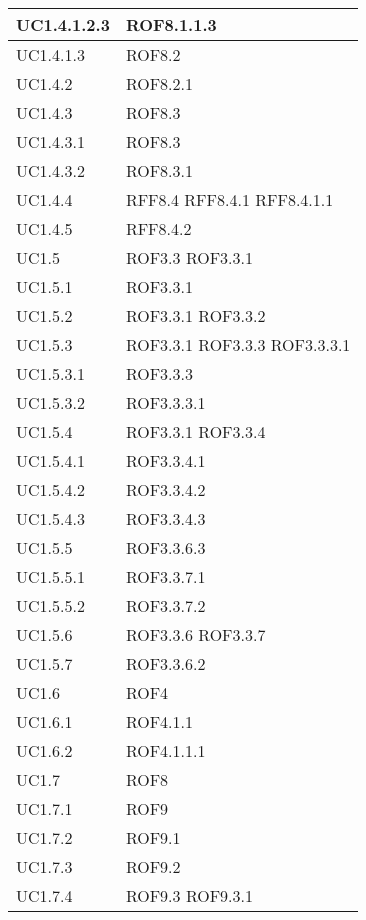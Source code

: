 \begin{center}
\begin{longtable}{| p{4cm} | p{4cm} |}
\hline
UC1.4.1.2.3 & ROF8.1.1.3 \\
\hline
UC1.4.1.3 & ROF8.2 \\
\hline
UC1.4.2 & ROF8.2.1 \\
\hline
UC1.4.3 & ROF8.3 \\
\hline
UC1.4.3.1 & ROF8.3 \\
\hline
UC1.4.3.2 & ROF8.3.1 \\
\hline
UC1.4.4 & RFF8.4 \newline RFF8.4.1 \newline RFF8.4.1.1 \\
\hline
UC1.4.5 & RFF8.4.2 \\
\hline
UC1.5 & ROF3.3 \newline ROF3.3.1 \\
\hline
UC1.5.1 & ROF3.3.1 \\
\hline
UC1.5.2 & ROF3.3.1 \newline ROF3.3.2 \\
\hline
UC1.5.3 & ROF3.3.1 \newline ROF3.3.3 \newline ROF3.3.3.1 \\
\hline
UC1.5.3.1 & ROF3.3.3 \\
\hline
UC1.5.3.2 & ROF3.3.3.1 \\
\hline
UC1.5.4 & ROF3.3.1 \newline ROF3.3.4 \\
\hline
UC1.5.4.1 & ROF3.3.4.1 \\
\hline
UC1.5.4.2 & ROF3.3.4.2 \\
\hline
UC1.5.4.3 & ROF3.3.4.3 \\
\hline
UC1.5.5 & ROF3.3.6.3 \\
\hline
UC1.5.5.1 & ROF3.3.7.1 \\
\hline
UC1.5.5.2 & ROF3.3.7.2 \\
\hline
UC1.5.6 & ROF3.3.6 \newline ROF3.3.7 \\
\hline
UC1.5.7 & ROF3.3.6.2 \\
\hline
UC1.6 & ROF4 \\
\hline
UC1.6.1 & ROF4.1.1 \\
\hline
UC1.6.2 & ROF4.1.1.1 \\
\hline
UC1.7 & ROF8 \\
\hline
UC1.7.1 & ROF9 \\
\hline
UC1.7.2 & ROF9.1 \\
\hline
UC1.7.3 & ROF9.2 \\
\hline
UC1.7.4 & ROF9.3 \newline ROF9.3.1 \\

\end{longtable}
\end{center}
